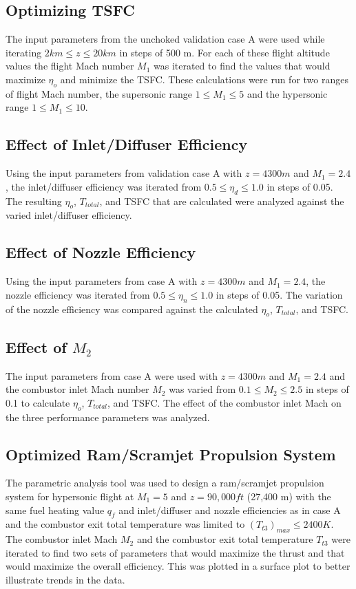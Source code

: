 \documentclass[conf]{new-aiaa} %
\begin{document}
\subsection{Optimizing TSFC} %
The input parameters from the unchoked validation case A were used while iterating $2 km \leq z \leq 20 km$ in steps of 500 m. For each of these flight altitude values the flight Mach number $M_1$ was iterated to find the values that would maximize $\eta_o$ and minimize the TSFC. These calculations were run for two ranges of flight Mach number, the supersonic range $1\leq M_1\leq 5$ and the hypersonic range $1\leq M_1\leq10$.

\subsection{Effect of Inlet/Diffuser Efficiency} %
Using the input parameters from validation case A with $z=4300m$ and $M_1=2.4$, the inlet/diffuser efficiency was iterated from $0.5\leq\eta_d\leq1.0$ in steps of 0.05. The resulting $\eta_o$, $T_{total}$, and TSFC that are calculated were analyzed against the varied inlet/diffuser efficiency.

\subsection{Effect of Nozzle Efficiency} %
Using the input parameters from case A with $z=4300m$ and $M_1=2.4$, the nozzle efficiency was iterated from $0.5\leq\eta_n\leq1.0$ in steps of 0.05. The variation of the nozzle efficiency was compared against the calculated $\eta_o$, $T_{total}$, and TSFC.

\subsection{Effect of \texorpdfstring{\textit{$M_2$}}{M2}} %
The input parameters from case A were used with $z=4300m$ and $M_1=2.4$ and the combustor inlet Mach number $M_2$ was varied from $0.1\leq M_2\leq2.5$ in steps of 0.1 to calculate $\eta_o$, $T_{total}$, and TSFC. The effect of the combustor inlet Mach on the three performance parameters was analyzed.

\subsection{Optimized Ram/Scramjet Propulsion System} %
The parametric analysis tool was used to design a ram/scramjet propulsion system for hypersonic flight at $M_1=5$ and $z=90,000ft$ (27,400 m) with the same fuel heating value $q_f$ and inlet/diffuser and nozzle efficiencies as in case A and the combustor exit total temperature was limited to $\left(T_{t3}\right)_{max}\leq2400K$. The combustor inlet Mach $M_2$ and the combustor exit total temperature $T_{t3}$ were iterated to find two sets of parameters that would maximize the thrust and that would maximize the overall efficiency. This was plotted in a surface plot to better illustrate trends in the data.
\end{document}
